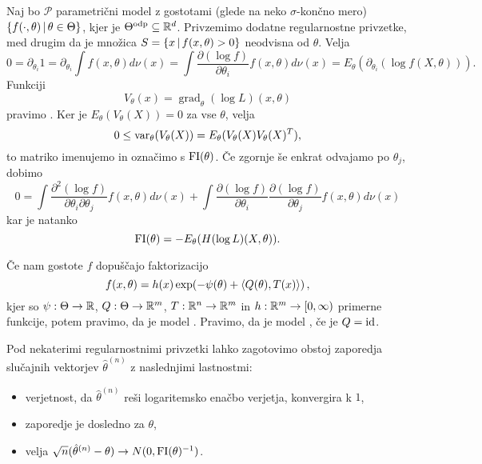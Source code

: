 Naj bo $\mathcal{P}$ parametrični model z gostotami (glede na neko
$\sigma$-končno mero) $\{f(\cdot, \theta) \,|\, \theta \in \Theta\}$, kjer je
$\Theta ^\text{\normalfont odp}\subseteq\mathbb{R}^d$.
Privzemimo dodatne regularnostne privzetke, med drugim da je množica $S = \{ x
\,|\, f(x,\theta) > 0 \}$ neodvisna od $\theta$.
Velja
\[
  0 = \partial_{\theta_i} 1
  = \partial_{\theta_i} \int f(x,\theta) d\nu(x)
  = \int \frac{\partial(\log f)}{\partial \theta_i} f(x,\theta) d\nu(x)
  = E_\theta(\partial_{\theta_i}(\log f(X,\theta))).
\]
Funkciji
\[
  V_\theta(x) = \operatorname{grad}_\theta(\log L)(x, \theta)
\]
pravimo .
Ker je $E_\theta(V_\theta(X)) = 0$ za vse $\theta$, velja
\[
  0 \le \operatorname{var}_\theta(V_\theta(X)) = E_\theta(V_\theta(X) V_\theta(X)^T),
\]
to matriko imenujemo  in označimo s $\operatorname{FI}(\theta)$.
Če zgornje še enkrat odvajamo po $\theta_j$, dobimo
\[
  0 = 
  \int \frac{\partial^2(\log f)}{\partial \theta_i \partial \theta_j} f(x,
  \theta) d\nu(x)
  + \int \frac{\partial(\log f)}{\partial \theta_i} \frac{\partial(\log
	f)}{\partial \theta_j} f(x, \theta) d\nu(x)
\]
kar je natanko
\[
  \operatorname{FI}(\theta) = -E_\theta(H(\log L)(X, \theta)).
\]

Če nam gostote $f$ dopuščajo faktorizacijo
\[
  f(x,\theta) = h(x) \exp\!\left( -\psi(\theta) + \left< Q(\theta), T(x) \right> \right),
\]
kjer so $\psi: \Theta \to \mathbb{R}$, $Q: \Theta \to \mathbb{R}^m$, $T: \mathbb{R}^n \to \mathbb{R}^m$ in $h:
\mathbb{R}^m \to \left[0, \infty\right)$ primerne funkcije, potem pravimo, da je model
.
Pravimo, da je model , če je $Q = \operatorname{id}$.

Pod nekaterimi regularnostnimi privzetki lahko zagotovimo obstoj zaporedja
slučajnih vektorjev $\hat{\theta}^{(n)}$ z naslednjimi lastnostmi:
\begin{itemize}
\item verjetnost, da $\hat{\theta}^{(n)}$ reši logaritemsko enačbo verjetja,
  konvergira k $1$,
\item zaporedje je dosledno za $\theta$,
\item velja $\sqrt{n} (\hat{\theta}^{(n)} - \theta) \to N(0, \operatorname{FI}(\theta)^{-1})$.
\end{itemize}

